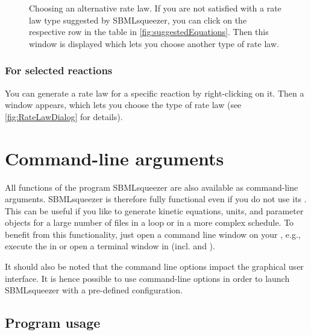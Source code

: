 \begin{figure}
\caption[Choosing an alternative rate law]{Choosing an alternative rate law.
If you are not satisfied with a rate law type suggested by SBMLsqueezer, you can click on the respective row in the table in \vref{fig:suggestedEquations}. Then this window is displayed which lets you choose another type of rate law.}
\label{fig:changeEquation}
\end{figure}

\subsection{For selected reactions}
You can generate a rate law for a specific reaction by right-clicking on it. Then a window appears, which lets you choose the type of rate law (see \vref{fig:RateLawDialog} for details).


\chapter{Command-line arguments}
\label{chap:CMD}
\renewcommand{\descriptionlabel}[1]{\textcolor{blue}{\texttt{#1}}}

All functions of the program SBMLsqueezer are also available as command-line
arguments. SBMLsqueezer is therefore fully functional even if you do not use
its \GUI.
This can be useful if you like to generate kinetic equations, units, and
parameter objects for a large number of \SBML files in a loop or in a more
complex schedule.
To benefit from this functionality, just open a command line window on your
\OS, e.g., execute the  in \Windows or open a terminal window
in \Unix (incl. \Linux and \MacOSX).

It should also be noted that the command line options impact the graphical user
interface. It is hence possible to use command-line options in order to launch
SBMLsqueezer with a pre-defined configuration.

\section{Program usage}
\label{sec:Program_usage}

